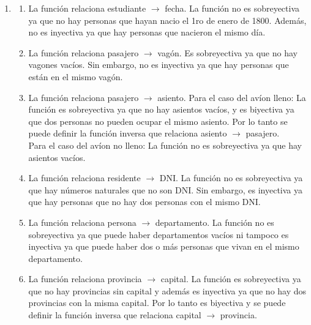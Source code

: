 \documentclass[a4paper]{article}
\newcommand{\exercise}{\item}
\begin{document}
\begin{enumerate}
\begin{enumerate} [label=(\alph*)]
		\item No es función ya que $c$ no está relacionado a ningún elmento.
		\item Es función, por lo que la nombraremos $f$ en vez de $R$. Como $I_f=\{a,d\} \neq Cod_f$, no es sobreyectiva. Además, $f(a)=f(b)=f(d)=f(e)$, por lo que no es inyectiva. Por lo que no es biyectiva, ni admite inversa.
		\item Es función, por lo que la nombraremos $f$ en vez de $R$. Como $I_f=\{a,b,c,d,e\}=A=Cod_f$, es sobreyectiva. Además, por inspección, es inyectiva. Por lo que es biyectiva. \\ La inversa es $f^{-1}=\{(c,a), (e,b), (a,c), (b,d), (d,e)\}$.
\end{enumerate}\exercise\begin{enumerate} [label=(\alph*)]		\item La función relaciona estudiante $\to$ fecha. La función no es sobreyectiva ya que no hay personas que hayan nacio el 1ro de enero de 1800. Además, no es inyectiva ya que hay personas que nacieron el mismo día.
		\item La función relaciona pasajero $\to$ vagón. Es sobreyectiva ya que no hay vagones vacíos. Sin embargo, no es inyectiva ya que hay personas que están en el mismo vagón.
		\item La función relaciona pasajero $\to$ asiento. Para el caso del avíon lleno: La función es sobreyectiva ya que no hay asientos vacíos, y es biyectiva ya que dos personas no pueden ocupar el mismo asiento. Por lo tanto se puede definir la función inversa que relaciona asiento $\to$ pasajero. \\ Para el caso del avíon no lleno: La función no es sobreyectiva ya que hay asientos vacíos.
		\item La función relaciona residente $\to$ DNI. La función no es sobreyectiva ya que hay números naturales que no son DNI. Sin embargo, es inyectiva ya que hay personas que no hay dos personas con el mismo DNI.
		\item La función relaciona persona $\to$ departamento. La función no es sobreyectiva ya que puede haber departamentos vacíos ni tampoco es inyectiva ya que puede haber dos o más personas que vivan en el mismo departamento.
		\item La función relaciona provincia $\to$ capital. La función es sobreyectiva ya que no hay provincias sin capital y además es inyectiva ya que no hay dos provincias con la misma capital. Por lo tanto es biyectiva y se puede definir la función inversa que relaciona capital $\to$ provincia.

\end{enumerate}
\end{enumerate}
\end{document}
